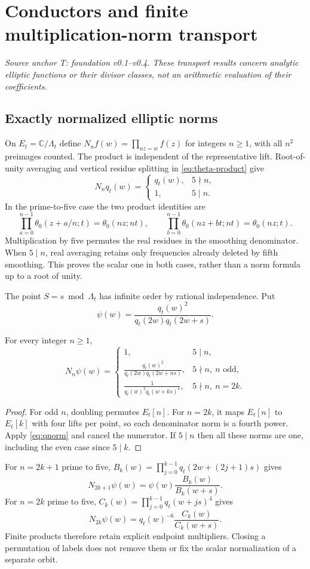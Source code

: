 \section{Conductors and finite multiplication-norm transport}\label{sec:norms}
\noindent\textit{Source anchor T: foundation v0.1--v0.4. These transport results concern analytic elliptic functions or their divisor classes, not an arithmetic evaluation of their coefficients.}

\subsection{Exactly normalized elliptic norms}
On $E_t=\mathbb C/\Lambda_t$ define $N_nf(w)=\prod_{nz=w}f(z)$ for integers $n\ge1$, with all $n^2$ preimages counted. The product is independent of the representative lift. Root-of-unity averaging and vertical residue splitting in \eqref{eq:theta-product} give
\begin{equation}\label{eq:qnorm}
 N_nq_t(w)=\begin{cases}q_t(w),&5\nmid n,\\1,&5\mid n.\end{cases}
\end{equation}
In the prime-to-five case the two product identities are
\[
 \prod_{a=0}^{n-1}\theta_0(z+a/n;t)=\theta_0(nz;nt),\qquad
 \prod_{b=0}^{n-1}\theta_0(nz+bt;nt)=\theta_0(nz;t).
\]
Multiplication by five permutes the real residues in the smoothing denominator. When $5\mid n$, real averaging retains only frequencies already deleted by fifth smoothing. This proves the scalar one in both cases, rather than a norm formula up to a root of unity.

The point $S=s\bmod\Lambda_t$ has infinite order by rational independence. Put
\[
 \psi(w)=\frac{q_t(w)^2}{q_t(2w)q_t(2w+s)}.
\]
\begin{proposition}\label{prop:allnorms}
For every integer $n\ge1$,
\[
 N_n\psi(w)=
 \begin{cases}
 1,&5\mid n,\\[2pt]
 \displaystyle\frac{q_t(w)^2}{q_t(2w)q_t(2w+ns)},&5\nmid n,\ n\text{ odd},\\[7pt]
 \displaystyle\frac1{q_t(w)^2q_t(w+ks)^4},&5\nmid n,\ n=2k.
 \end{cases}
\]
\end{proposition}
\begin{proof}
For odd $n$, doubling permutes $E_t[n]$. For $n=2k$, it maps $E_t[n]$ to $E_t[k]$ with four lifts per point, so each denominator norm is a fourth power. Apply \eqref{eq:qnorm} and cancel the numerator. If $5\mid n$ then all these norms are one, including the even case since $5\mid k$.
\end{proof}
For $n=2k+1$ prime to five, $B_k(w)=\prod_{j=0}^{k-1}q_t(2w+(2j+1)s)$ gives
\[
 N_{2k+1}\psi(w)=\psi(w)\frac{B_k(w)}{B_k(w+s)}.
\]
For $n=2k$ prime to five, $C_k(w)=\prod_{j=0}^{k-1}q_t(w+js)^4$ gives
\[
 N_{2k}\psi(w)=q_t(w)^{-6}\frac{C_k(w)}{C_k(w+s)}.
\]
Finite products therefore retain explicit endpoint multipliers. Closing a permutation of labels does not remove them or fix the scalar normalization of a separate orbit.


